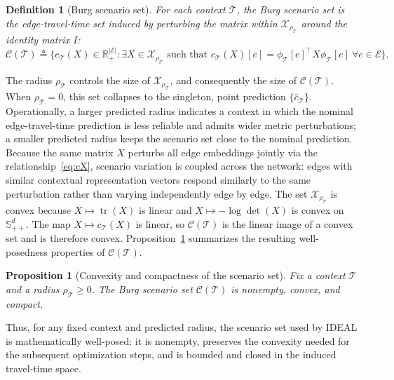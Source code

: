 \documentclass[11pt, letterpaper, oneside, reqno]{amsart}
\DeclareMathOperator{\Tr}{tr}
\newcommand{\R}{\mathbb{R}}
\newcommand{\Let}{\triangleq}
\newtheorem{proposition}{Proposition}
\newtheorem{definition}{Definition}
\begin{document}
\begin{definition}[Burg scenario set] \label{def:C-rho}
For each context $\mathcal T$, the Burg scenario set is the edge-travel-time set induced by perturbing the matrix within $\mathcal X_{\rho_{\mathcal T}}$ around the identity matrix $I$:
\begin{equation}
\label{eq:scenario-set}
\mathcal C(\mathcal T)
\Let
\bigl\{
c_{\mathcal T}(X) \in \R_+^{|\mathcal E|} : \exists X \in \mathcal X_{\rho_{\mathcal T}} \text{ such that } c_{\mathcal T}(X)[e] = \phi_{\mathcal T}[e]^\top X \phi_{\mathcal T}[e]
~ \forall e \in \mathcal E
\bigr\}.
\end{equation}
\end{definition}

The radius $\rho_{\mathcal T}$ controls the size of $\mathcal X_{\rho_{\mathcal T}}$, and consequently the size of $\mathcal C(\mathcal T)$. When $\rho_{\mathcal T}=0$, this set collapses to the singleton, point prediction $\{\hat c_{\mathcal T}\}$. 
Operationally, a larger predicted radius indicates a context in which the nominal edge-travel-time prediction is less reliable and admits wider metric perturbations; a smaller predicted radius keeps the scenario set close to the nominal prediction. Because the same matrix $X$ perturbs all edge embeddings jointly via the relationship~\eqref{eq:cX}, scenario variation is coupled across the network: edges with similar contextual representation vectors respond similarly to the same perturbation rather than varying independently edge by edge.
The set $\mathcal X_{\rho_{\mathcal T}}$ is convex because $X\mapsto \Tr(X)$ is linear and $X\mapsto -\log\det(X)$ is convex on $\mathbb S_{++}^d$. The map $X\mapsto c_{\mathcal T}(X)$ is linear, so $\mathcal C(\mathcal T)$ is the linear image of a convex set and is therefore convex.
Proposition~\ref{prop:attainment} summarizes the resulting well-posedness properties of $\mathcal C(\mathcal T)$.

\begin{proposition}[Convexity and compactness of the scenario set]
\label{prop:attainment}
Fix a context $\mathcal T$ and a radius $\rho_{\mathcal T} \ge 0$. The Burg scenario set $\mathcal C(\mathcal T)$ is nonempty, convex, and compact.
\end{proposition}

Thus, for any fixed context and predicted radius, the scenario set used by IDEAL is mathematically well-posed: it is nonempty, preserves the convexity needed for the subsequent optimization steps, and is bounded and closed in the induced travel-time space.
\end{document}
